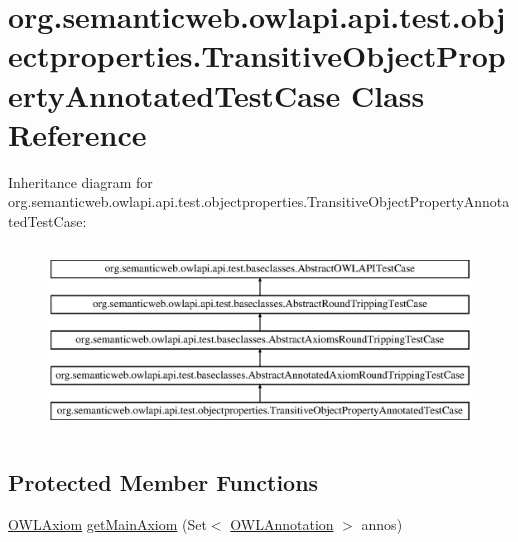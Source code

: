 \hypertarget{classorg_1_1semanticweb_1_1owlapi_1_1api_1_1test_1_1objectproperties_1_1_transitive_object_property_annotated_test_case}{\section{org.\-semanticweb.\-owlapi.\-api.\-test.\-objectproperties.\-Transitive\-Object\-Property\-Annotated\-Test\-Case Class Reference}
\label{classorg_1_1semanticweb_1_1owlapi_1_1api_1_1test_1_1objectproperties_1_1_transitive_object_property_annotated_test_case}
}
Inheritance diagram for org.\-semanticweb.\-owlapi.\-api.\-test.\-objectproperties.\-Transitive\-Object\-Property\-Annotated\-Test\-Case\-:\begin{figure}[H]
\begin{center}
\leavevmode
\includegraphics[height=5.000000cm]{classorg_1_1semanticweb_1_1owlapi_1_1api_1_1test_1_1objectproperties_1_1_transitive_object_property_annotated_test_case}
\end{center}
\end{figure}
\subsection*{Protected Member Functions}
\begin{DoxyCompactItemize}
\item 
\hyperlink{interfaceorg_1_1semanticweb_1_1owlapi_1_1model_1_1_o_w_l_axiom}{O\-W\-L\-Axiom} \hyperlink{classorg_1_1semanticweb_1_1owlapi_1_1api_1_1test_1_1objectproperties_1_1_transitive_object_property_annotated_test_case_ac02dac319faa9e65ad6daa889d4bba22}{get\-Main\-Axiom} (Set$<$ \hyperlink{interfaceorg_1_1semanticweb_1_1owlapi_1_1model_1_1_o_w_l_annotation}{O\-W\-L\-Annotation} $>$ annos)
\end{DoxyCompactItemize}
